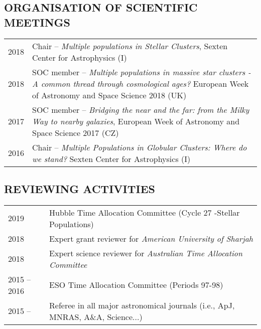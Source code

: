 \documentclass[ 11pt]{article}
\begin{document}
\subsection*{ORGANISATION OF SCIENTIFIC MEETINGS}
\begin{tabular}{p{2cm}p{14cm}}
2018  & Chair --  {\em Multiple populations in Stellar Clusters}, Sexten Center for Astrophysics (I) \\
 2018 & SOC member -- {\em Multiple populations in massive star clusters - A common thread through
cosmological ages?} European Week of Astronomy and Space Science 2018 (UK)\\
 2017 & SOC member -- {\em Bridging the near and the far: from the Milky Way to nearby galaxies}, European Week of Astronomy and Space Science 2017 (CZ)\\
 2016 &Chair -- {\em Multiple Populations in Globular Clusters: Where do we stand?} Sexten Center for Astrophysics (I) \\
\end{tabular}

\subsection*{REVIEWING ACTIVITIES}
\begin{tabular}{p{2cm}p{14cm}}
 2019  & Hubble Time Allocation Committee (Cycle 27 -Stellar Populations)\\
 2018 & Expert grant reviewer for {\em American University of Sharjah}\\
 2018  & Expert  science reviewer for {\em Australian Time Allocation Committee}\\
 2015 -- 2016 & ESO Time Allocation Committee (Periods 97-98)\\
 2015 --   & Referee in all major astronomical journals (i.e., ApJ, MNRAS, A\&A, Science...)
 \end{tabular}
\end{document}

